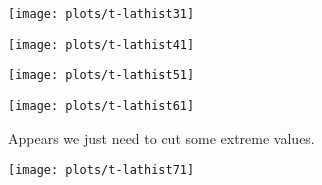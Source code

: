 \documentclass[11pt,english]{beamer}
\begin{document}

\begin{frame}[containsverbatim]





\texttt{[image: plots/t-lathist31]}

\end{frame}


\begin{frame}[containsverbatim]





\texttt{[image: plots/t-lathist41]}


\end{frame}


\begin{frame}[containsverbatim]





\texttt{[image: plots/t-lathist51]}

\end{frame}


\begin{frame}[containsverbatim]






\texttt{[image: plots/t-lathist61]}


\end{frame}


\begin{frame}[containsverbatim]

  Appears we just need to cut some extreme values.



\end{frame}


\begin{frame}[containsverbatim]





\texttt{[image: plots/t-lathist71]}



\end{frame}
\end{document}
